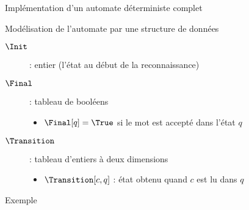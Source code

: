 
\begingroup

\begin{frame}{Implémentation d'un automate déterministe complet}
  \vspace{-7mm}
  \begin{block}{Modélisation de l'automate par une structure de données}
  \vspace{-2mm}
    \begin{description}
    \item[$\Init$] : entier (l'état au début de la reconnaissance)
    \item[{$\Final$}] : tableau de booléens
    \begin{itemize}
    \item $\Final[q] = \True$ si le mot est accepté dans l'état $q$
    \end{itemize}
    \item[{$\Transition$}] : tableau d'entiers à deux dimensions
    \begin{itemize}
    \item $\Transition[c, q]$ : état obtenu quand $c$ est lu dans $q$
    \end{itemize}
    \end{description}
\end{block}

  \vspace{-2mm}
  \begin{exampleblock}{Exemple}
  \vspace{-2mm}
\end{exampleblock}
\end{frame}
